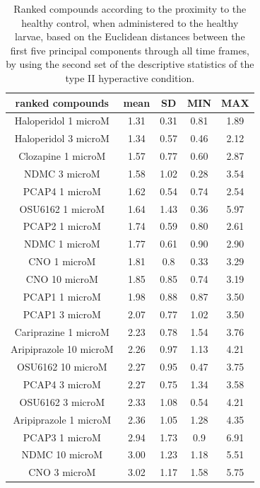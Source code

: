 \documentclass[a4paper,12pt]{article}
\begin{document}
\begin{table}[h!]\tiny
\centering
\caption{Ranked compounds according to the proximity to the healthy control, when administered to the healthy larvae, based on the Euclidean distances between the first five principal components through all time frames, by using the second set of the descriptive statistics of the type II hyperactive condition.}
\begin{tabular}{|c|c|c|c|c|}
\hline
ranked compounds             & mean & SD   & MIN  & MAX   \\ \hline
Haloperidol 1 microM   & 1.31 & 0.31 & 0.81 & 1.89 \\ \hline
Haloperidol 3 microM   & 1.34 & 0.57 & 0.46 & 2.12 \\ \hline
Clozapine 1 microM     & 1.57 & 0.77 & 0.60  & 2.87 \\ \hline
NDMC 3 microM          & 1.58 & 1.02 & 0.28 & 3.54 \\ \hline
PCAP4 1 microM       & 1.62 & 0.54 & 0.74 & 2.54 \\ \hline
OSU6162 1 microM       & 1.64 & 1.43 & 0.36 & 5.97 \\ \hline
PCAP2 1 microM         & 1.74 & 0.59 & 0.80  & 2.61 \\ \hline
NDMC 1 microM          & 1.77 & 0.61 & 0.90  & 2.90  \\ \hline
CNO 1 microM           & 1.81 & 0.8  & 0.33 & 3.29 \\ \hline
CNO 10 microM          & 1.85 & 0.85 & 0.74 & 3.19 \\ \hline
PCAP1 1 microM         & 1.98 & 0.88 & 0.87 & 3.50  \\ \hline
PCAP1 3 microM         & 2.07 & 0.77 & 1.02 & 3.50  \\ \hline
Cariprazine 1 microM   & 2.23 & 0.78 & 1.54 & 3.76 \\ \hline
Aripiprazole 10 microM & 2.26 & 0.97 & 1.13 & 4.21 \\ \hline
OSU6162 10 microM      & 2.27 & 0.95 & 0.47 & 3.75 \\ \hline
PCAP4 3 microM       & 2.27 & 0.75 & 1.34 & 3.58 \\ \hline
OSU6162 3 microM       & 2.33 & 1.08 & 0.54 & 4.21 \\ \hline
Aripiprazole 1 microM  & 2.36 & 1.05 & 1.28 & 4.35 \\ \hline
PCAP3 1 microM       & 2.94 & 1.73 & 0.9  & 6.91 \\ \hline
NDMC 10 microM         & 3.00    & 1.23 & 1.18 & 5.51 \\ \hline
CNO 3 microM           & 3.02 & 1.17 & 1.58 & 5.75 \\ \hline

\end{tabular}
\end{table}
\end{document}

